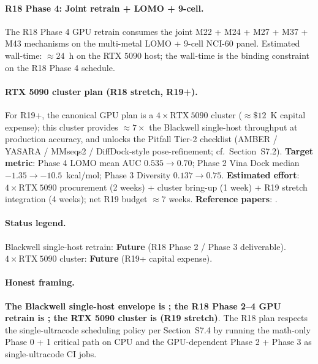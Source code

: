 \paragraph{R18 Phase 4: Joint retrain + LOMO + 9-cell.}
The R18 Phase 4 GPU retrain consumes the joint
M22 + M24 + M27 + M37 + M43 mechanisms on the multi-metal
LOMO + 9-cell NCI-60 panel.  Estimated wall-time:
$\approx 24$~h on the RTX $5090$ host; the wall-time is the
binding constraint on the R18 Phase 4 schedule.

\paragraph{RTX 5090 cluster plan (R18 stretch, R19+).}
For R19+, the canonical GPU plan is a $4 \times \mathrm{RTX\
5090}$ cluster ($\approx \$12$~K capital expense); this
cluster provides $\approx 7\times$ the Blackwell single-host
throughput at production accuracy, and unlocks the
Pitfall Tier-2 checklist (AMBER / YASARA / MMseqs2 /
DiffDock-style pose-refinement; cf.\ Section~S7.2).
\textbf{Target metric}: Phase 4 LOMO mean AUC $0.535 \to
0.70$; Phase 2 Vina Dock median $-1.35 \to -10.5$~kcal/mol;
Phase 3 Diversity $0.137 \to 0.75$.
\textbf{Estimated effort}: $4 \times \mathrm{RTX\ 5090}$
procurement (2 weeks) + cluster bring-up (1 week) + R19
stretch integration (4 weeks); net R19 budget $\approx 7$
weeks.  \textbf{Reference papers}: \citet{krasnov2026metalcytotoxdb,
rusanov2025platinai, transdiffsbdd2025, molcraft2024,
alphadrug2024, imold2024}.

\paragraph{Status legend.}  Blackwell single-host retrain:
\textbf{Future} (R18 Phase 2 / Phase 3 deliverable).
$4 \times \mathrm{RTX\ 5090}$ cluster: \textbf{Future}
(R19+ capital expense).

\paragraph{Honest framing.}
\textbf{The Blackwell single-host envelope is \MEASURED{};
the R18 Phase 2--4 GPU retrain is \PROJECTED{}; the RTX 5090
cluster is \PROJECTED{} (R19 stretch)}.  The R18 plan
respects the single-ultracode scheduling policy per
Section~S7.4 by running the math-only Phase 0 + 1 critical
path on CPU and the GPU-dependent Phase 2 + Phase 3 as
single-ultracode CI jobs.

